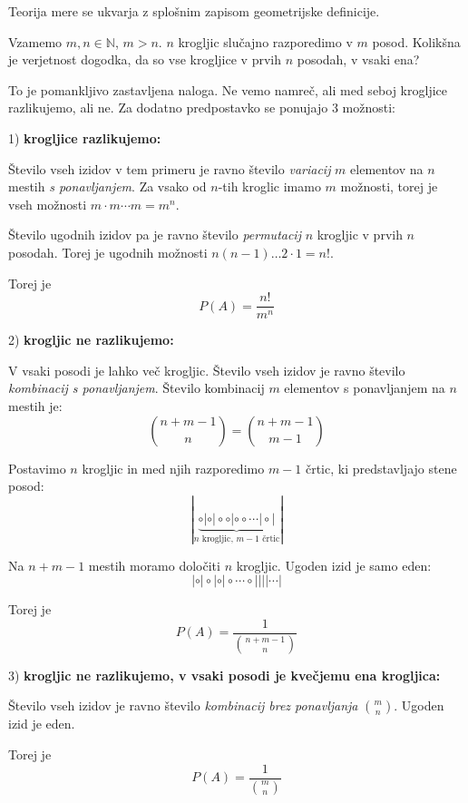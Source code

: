 \documentclass[12pt]{book}
\def\n{\noindent}
\theoremstyle{definition}
\theoremstyle{plain}
\theoremstyle{plain}
\theoremstyle{plain}
\theoremstyle{remark}
\begin{document}
\n Teorija mere se ukvarja z splošnim zapisom geometrijske definicije. 

\begin{zgled}
    Vzamemo $m, n \in \mathbb{N}$, $m>n$. $n$ krogljic slučajno razporedimo v $m$ posod. Kolikšna je verjetnost dogodka, da so vse krogljice v prvih $n$ posodah, v vsaki ena?

    To je pomankljivo zastavljena naloga. Ne vemo namreč, ali med seboj krogljice razlikujemo, ali ne. Za dodatno predpostavko se ponujajo 3 možnosti: 

    1) \textbf{krogljice razlikujemo:}
    
    \n Število vseh izidov v tem primeru je ravno število \emph{variacij} $m$ elementov na $n$ mestih \emph{s ponavljanjem}. Za vsako od $n$-tih kroglic imamo $m$ možnosti, torej je vseh možnosti $m \cdot m \cdots m=m^n$.
    
    \n Število ugodnih izidov pa je ravno število \emph{permutacij} $n$ krogljic v prvih $n$ posodah. Torej je ugodnih možnosti $n(n-1) \ldots 2 \cdot 1=n!$.
    
    Torej je $$P(A)=\frac{n !}{m^n}$$

    2) \textbf{krogljic ne razlikujemo:} 
    
    \n V vsaki posodi je lahko več krogljic. Število vseh izidov je ravno število \emph{kombinacij s ponavljanjem}. Število kombinacij $m$ elementov s ponavljanjem na $n$ mestih je: 
    $$
    \binom{n+m-1}{n} = \binom{n+m-1}{m-1}
    $$

    \n Postavimo $n$ krogljic in med njih razporedimo $m-1$ črtic, ki predstavljajo stene posod:
    $$
    |\underbrace{\circ|\circ|\circ\circ |\circ\circ  \cdots |\circ |}_{n \text{ krogljic, } m-1 \text{ črtic}}|
    $$

    \n Na $n+m-1$ mestih moramo določiti $n$ krogljic. Ugoden izid je samo eden: 
    $$
    |\circ|\circ|\circ|\circ \cdots \circ|||| \cdots |
    $$

    Torej je $$P(A)=\frac{1}{\binom{n+m-1}{n}}$$

    3) \textbf{krogljic ne razlikujemo, v vsaki posodi je kvečjemu ena krogljica:} 
    
    Število vseh izidov je ravno število \emph{kombinacij brez ponavljanja} $\binom{m}{n}$. Ugoden izid je eden. 

    Torej je $$P(A)=\frac{1}{\binom{m}{n}}$$
\end{zgled}
\end{document}

